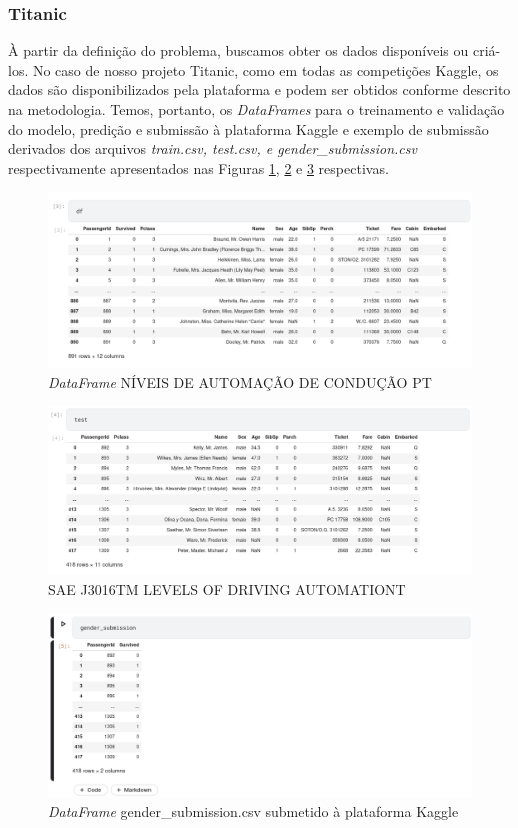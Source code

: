  \subsubsection{Titanic}
À partir da definição do problema, buscamos obter os dados disponíveis ou criá-los. No caso de nosso projeto Titanic, como em todas as competições Kaggle, os dados são disponibilizados pela plataforma e podem ser obtidos conforme descrito na metodologia. Temos, portanto, os \emph{DataFrames}  para o treinamento e validação do modelo, predição e submissão à plataforma Kaggle e exemplo de submissão derivados dos arquivos \emph{train.csv, test.csv, e gender\_submission.csv} respectivamente apresentados nas Figuras \ref{df.csv}, \ref{test.csv} e \ref{gender.submission.csv} respectivas. 
\begin{figure}[H]
\centering
\includegraphics[width=\textwidth]{Figures/df.png}
\caption{\emph{DataFrame} NÍVEIS DE AUTOMAÇÃO DE CONDUÇÃO PT}
\label{df.csv}
\end{figure}
\begin{figure}[H]
\centering
\includegraphics[width=\textwidth]{Figures/test.png}
\caption{SAE J3016TM LEVELS OF DRIVING AUTOMATIONT}
\label{test.csv}
\end{figure}
\begin{figure}[H]
\centering
\includegraphics[width=\textwidth]{Figures/gender_submission.png}
\caption{\emph{DataFrame} gender\_submission.csv submetido à plataforma Kaggle}
\label{gender.submission.csv}
\end{figure}

